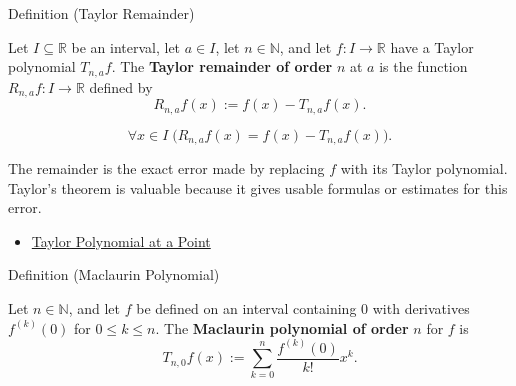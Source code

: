 
\begin{definitionbox}{Definition (Taylor Remainder)}
\begin{definition}
\label{def:taylor-remainder}
Let $I\subseteq\mathbb{R}$ be an interval, let $a\in I$, let
$n\in\mathbb{N}$, and let $f:I\to\mathbb{R}$ have a Taylor polynomial
$T_{n,a}f$. The \textbf{Taylor remainder of order} $n$ at $a$ is the
function $R_{n,a}f:I\to\mathbb{R}$ defined by
\[
  R_{n,a}f(x):=f(x)-T_{n,a}f(x).
\]
\end{definition}
\end{definitionbox}

\begin{remark*}
\[
\forall x\in I\;\bigl(R_{n,a}f(x)=f(x)-T_{n,a}f(x)\bigr).
\]
\end{remark*}

\begin{remark*}[Interpretation]
The remainder is the exact error made by replacing $f$ with its Taylor
polynomial. Taylor's theorem is valuable because it gives usable formulas
or estimates for this error.
\end{remark*}

\begin{dependencies}
\begin{itemize}
  \item \hyperref[def:taylor-polynomial-at-a-point]{Taylor Polynomial at a Point}
\end{itemize}
\end{dependencies}


\begin{definitionbox}{Definition (Maclaurin Polynomial)}
\begin{definition}
\label{def:maclaurin-polynomial}
Let $n\in\mathbb{N}$, and let $f$ be defined on an interval containing
$0$ with derivatives $f^{(k)}(0)$ for $0\le k\le n$. The
\textbf{Maclaurin polynomial of order} $n$ for $f$ is
\[
  T_{n,0}f(x)
  :=
  \sum_{k=0}^{n}\frac{f^{(k)}(0)}{k!}x^k.
\]
\end{definition}
\end{definitionbox}

